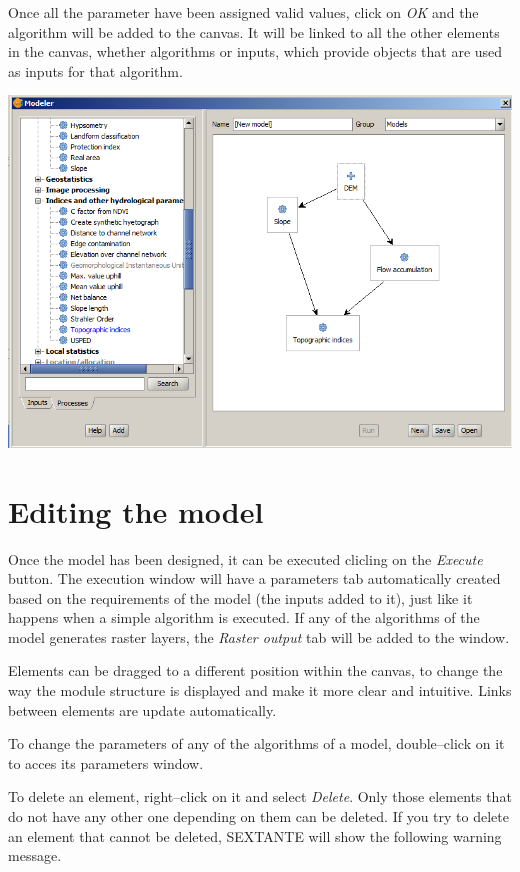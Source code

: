 Once all the parameter have been assigned valid values, click on \emph{OK} and the algorithm will be added to the canvas. It will be linked to all the other elements in the canvas, whether algorithms or inputs, which provide objects that are used as inputs for that algorithm.

\begin{center}
\includegraphics[width=.8\columnwidth]{models_parameters5.png}
\end{center}


\section{Editing the model}

Once the model has been designed, it can be executed clicling on the \emph{Execute} button. The execution window will have a parameters tab automatically created based on the requirements of the model (the inputs added to it), just like it happens when a simple algorithm is executed. If any of the algorithms of the model generates raster layers, the \emph{Raster output} tab will be added to the window. 

Elements can be dragged to a different position within the canvas, to change the way the module structure is displayed and make it more clear and intuitive. Links between elements are update automatically.

To change the parameters of any of the algorithms of a model, double--click on it to acces its parameters window.

To delete an element, right--click on it and select \emph{Delete}. Only those elements that do not have any other one depending on them can be deleted. If you try to delete an element that cannot be deleted, SEXTANTE will show the following warning message.


